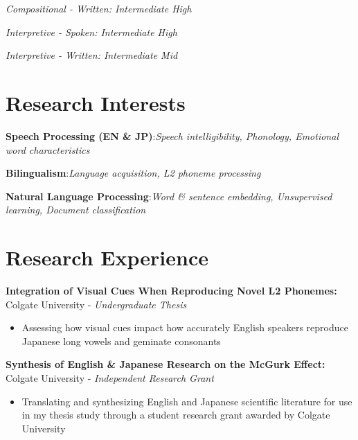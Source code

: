 \documentclass[a4paper,9pt]{extarticle}
\begin{document}
\textit{Compositional - Written: Intermediate High}

\textit{Interpretive - Spoken: Intermediate High}

\textit{Interpretive - Written: Intermediate Mid}




\section*{Research Interests}

\noindent
\textbf{Speech Processing (EN \& JP)}:\textit{Speech intelligibility, Phonology, Emotional word characteristics}

\noindent
\textbf{Bilingualism}:\textit{Language acquisition, L2 phoneme processing}

\noindent
\textbf{Natural Language Processing}:\textit{Word \& sentence embedding, Unsupervised learning, Document classification}





\section*{Research Experience}

\noindent
\textbf{Integration of Visual Cues When Reproducing Novel L2 Phonemes:}
Colgate University - \textit{Undergraduate Thesis}
\begin{itemize}

\item Assessing how visual cues impact how accurately English speakers reproduce Japanese long vowels and geminate consonants
\end{itemize}

\noindent
\textbf{Synthesis of English \& Japanese Research on the McGurk Effect:}
Colgate University - \textit{Independent Research Grant}
\begin{itemize}

\item Translating and synthesizing English and Japanese scientific literature for use in my thesis study through a student research grant awarded by Colgate University
\end{itemize}
\end{document}
